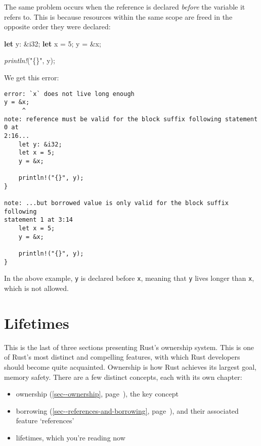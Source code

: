\documentclass[a4paper,]{book}
\renewcommand*{\hypertarget}[3][\ar]{%
  \def\ar{#2}%
  \label{#1}%
  #3}
\renewcommand*{\hyperlink}[2]{%
 #2 (\autoref{#1}, page~\pageref{#1})}
\newenvironment{Shaded}{\begin{snugshade}}{\end{snugshade}}
\newcommand{\KeywordTok}[1]{\textcolor[rgb]{0.13,0.29,0.53}{\textbf{{#1}}}}
\newcommand{\DataTypeTok}[1]{\textcolor[rgb]{0.13,0.29,0.53}{{#1}}}
\newcommand{\DecValTok}[1]{\textcolor[rgb]{0.00,0.00,0.81}{{#1}}}
\newcommand{\StringTok}[1]{\textcolor[rgb]{0.31,0.60,0.02}{{#1}}}
\newcommand{\PreprocessorTok}[1]{\textcolor[rgb]{0.56,0.35,0.01}{\textit{{#1}}}}
\newcommand{\NormalTok}[1]{{#1}}
\providecommand{\tightlist}{%
  \setlength{\itemsep}{0pt}\setlength{\parskip}{0pt}}
\begin{document}
The same problem occurs when the reference is declared \emph{before} the
variable it refers to. This is because resources within the same scope
are freed in the opposite order they were declared:

\begin{Shaded}
\begin{Highlighting}[]
\KeywordTok{let} \NormalTok{y: &}\DataTypeTok{i32}\NormalTok{;}
\KeywordTok{let} \NormalTok{x = }\DecValTok{5}\NormalTok{;}
\NormalTok{y = &x;}

\PreprocessorTok{println!}\NormalTok{(}\StringTok{"\{\}"}\NormalTok{, y);}
\end{Highlighting}
\end{Shaded}

We get this error:

\begin{verbatim}
error: `x` does not live long enough
y = &x;
     ^
note: reference must be valid for the block suffix following statement 0 at
2:16...
    let y: &i32;
    let x = 5;
    y = &x;

    println!("{}", y);
}

note: ...but borrowed value is only valid for the block suffix following
statement 1 at 3:14
    let x = 5;
    y = &x;

    println!("{}", y);
}
\end{verbatim}

In the above example, \texttt{y} is declared before \texttt{x}, meaning
that \texttt{y} lives longer than \texttt{x}, which is not allowed.

\hypertarget{sec--lifetimes}{\section{Lifetimes}\label{sec--lifetimes}}

This is the last of three sections presenting Rust's ownership system.
This is one of Rust's most distinct and compelling features, with which
Rust developers should become quite acquainted. Ownership is how Rust
achieves its largest goal, memory safety. There are a few distinct
concepts, each with its own chapter:

\begin{itemize}
\tightlist
\item
  \protect\hyperlink{sec--ownership}{ownership}, the key concept
\item
  \protect\hyperlink{sec--references-and-borrowing}{borrowing}, and
  their associated feature `references'
\item
  lifetimes, which you're reading now
\end{itemize}
\end{document}
